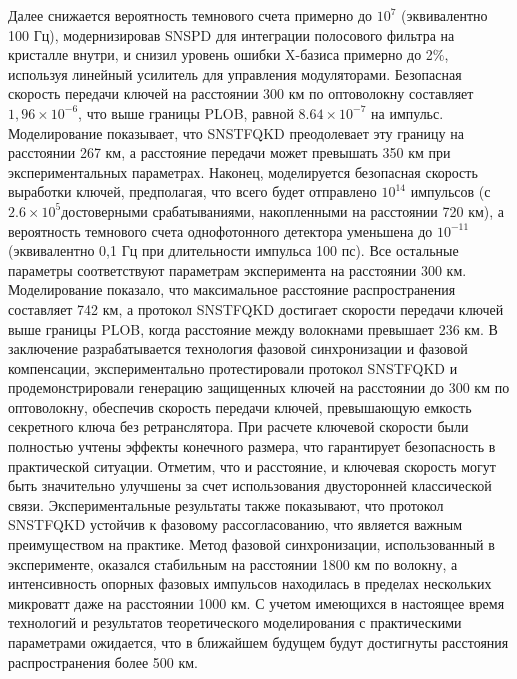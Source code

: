  Далее снижается вероятность темнового счета примерно до $10^7$ (эквивалентно 100 Гц), модернизировав SNSPD для интеграции полосового фильтра на кристалле внутри, и снизил уровень ошибки X-базиса примерно до 2$\%$, используя линейный усилитель для управления модуляторами. Безопасная скорость передачи ключей на расстоянии 300 км по оптоволокну составляет $1,96 × 10^{-6}$, что выше границы PLOB, равной $8.64 × 10^{-7}$ на импульс. Моделирование показывает, что SNSTFQKD преодолевает эту границу на расстоянии 267 км, а расстояние передачи может превышать 350 км при экспериментальных параметрах. Наконец, моделируется безопасная скорость выработки ключей, предполагая, что всего будет отправлено $10^{14}$ импульсов (с $2.6 × 10^5$достоверными срабатываниями, накопленными на расстоянии 720 км), а вероятность темнового счета однофотонного детектора уменьшена до $10^{-11}$ (эквивалентно 0,1 Гц при длительности импульса 100 пс). Все остальные параметры соответствуют параметрам эксперимента на расстоянии 300 км. Моделирование показало, что максимальное расстояние распространения составляет 742 км, а протокол SNSTFQKD достигает скорости передачи ключей выше границы PLOB, когда расстояние между волокнами превышает 236 км. В заключение разрабатывается технология фазовой синхронизации и фазовой компенсации, экспериментально протестировали протокол SNSTFQKD и продемонстрировали генерацию защищенных ключей на расстоянии до 300 км по оптоволокну, обеспечив скорость передачи ключей, превышающую емкость секретного ключа без ретранслятора. При расчете ключевой скорости были полностью учтены эффекты конечного размера, что гарантирует безопасность в практической ситуации. Отметим, что и расстояние, и ключевая скорость могут быть значительно улучшены за счет использования двусторонней классической связи. Экспериментальные результаты также показывают, что протокол SNSTFQKD устойчив к фазовому рассогласованию, что является важным преимуществом на практике. Метод фазовой синхронизации, использованный в эксперименте, оказался стабильным на расстоянии 1800 км по волокну, а интенсивность опорных фазовых импульсов находилась в пределах нескольких микроватт даже на расстоянии 1000 км. С учетом имеющихся в настоящее время технологий и результатов теоретического моделирования с практическими параметрами ожидается, что в ближайшем будущем будут достигнуты расстояния распространения более 500 км.



